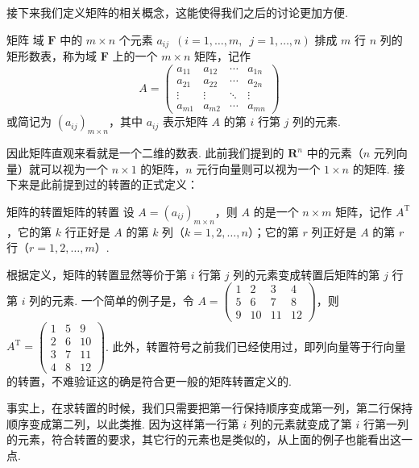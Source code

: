 接下来我们定义矩阵的相关概念，这能使得我们之后的讨论更加方便.

\begin{definition}{矩阵}{}
    域 $\mathbf{F}$ 中的 $m \times n$ 个元素 $a_{ij} \enspace (i = 1,\ldots,m, \enspace j=1,\ldots,n)$ 排成 $m$ 行 $n$ 列的矩形数表，称为域 $\mathbf{F}$ 上的一个 $m\times n$ 矩阵，记作
    \[A = \begin{pmatrix}
            a_{11} & a_{12} & \cdots & a_{1n} \\
            a_{21} & a_{22} & \cdots & a_{2n} \\
            \vdots & \vdots & \ddots & \vdots \\
            a_{m1} & a_{m2} & \cdots & a_{mn}
        \end{pmatrix}\]
    或简记为 $(a_{ij})_{m \times n}$，其中 $a_{ij}$ 表示矩阵 $A$ 的第 $i$ 行第 $j$ 列的元素.
\end{definition}

因此矩阵直观来看就是一个二维的数表. 此前我们提到的 $\mathbf{R}^n$ 中的元素（$n$ 元列向量）就可以视为一个 $n \times 1$ 的矩阵，$n$ 元行向量则可以视为一个 $1 \times n$ 的矩阵. 接下来是此前提到过的转置的正式定义：

\begin{definition}{矩阵的转置}{矩阵的转置}
    设 $A = (a_{ij})_{m \times n}$，则 $A$ 的是一个 $n \times m$ 矩阵，记作 $A^\mathrm{T}$，它的第 $k$ 行正好是 $A$ 的第 $k$ 列（$k = 1,2,\ldots,n$）；它的第 $r$ 列正好是 $A$ 的第 $r$ 行（$r = 1,2,\ldots,m$）.
\end{definition}

根据定义，矩阵的转置显然等价于第 $i$ 行第 $j$ 列的元素变成转置后矩阵的第 $j$ 行第 $i$ 列的元素. 一个简单的例子是，令 $A = \begin{pmatrix}1 & 2 & 3 & 4 \\ 5 & 6 & 7 & 8 \\ 9 & 10 & 11 & 12\end{pmatrix}$，则 $A^\mathrm{T} = \begin{pmatrix}1 & 5 & 9 \\ 2 & 6 & 10 \\ 3 & 7 & 11 \\ 4 & 8 & 12\end{pmatrix}$. 此外，转置符号之前我们已经使用过，即列向量等于行向量的转置，不难验证这的确是符合更一般的矩阵转置定义的.

事实上，在求转置的时候，我们只需要把第一行保持顺序变成第一列，第二行保持顺序变成第二列，以此类推. 因为这样第一行第 $i$ 列的元素就变成了第 $i$ 行第一列的元素，符合转置的要求，其它行的元素也是类似的，从上面的例子也能看出这一点.

